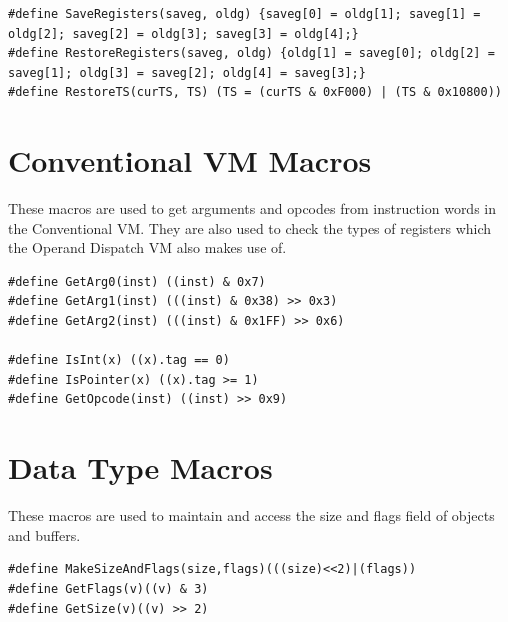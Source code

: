 \documentclass[english,a4paper,12pt]{report}
\begin{document}
\begin{lstlisting}
#define SaveRegisters(saveg, oldg) {saveg[0] = oldg[1]; saveg[1] = oldg[2]; saveg[2] = oldg[3]; saveg[3] = oldg[4];}
#define RestoreRegisters(saveg, oldg) {oldg[1] = saveg[0]; oldg[2] = saveg[1]; oldg[3] = saveg[2]; oldg[4] = saveg[3];}
#define RestoreTS(curTS, TS) (TS = (curTS & 0xF000) | (TS & 0x10800))
\end{lstlisting}

\section{Conventional VM Macros}
\label{sec:convmacros}

These macros are used to get arguments and opcodes from instruction
words in the Conventional VM. They are also used to check the types of
registers which the Operand Dispatch VM also makes use of.

\begin{lstlisting}
#define GetArg0(inst) ((inst) & 0x7) 
#define GetArg1(inst) (((inst) & 0x38) >> 0x3)
#define GetArg2(inst) (((inst) & 0x1FF) >> 0x6) 

#define IsInt(x) ((x).tag == 0)
#define IsPointer(x) ((x).tag >= 1)
#define GetOpcode(inst) ((inst) >> 0x9)
\end{lstlisting}

\section{Data Type Macros}
\label{sec:datamacros}
These macros are used to maintain and access the size and flags field
of objects and buffers.

\begin{lstlisting}
#define MakeSizeAndFlags(size,flags)(((size)<<2)|(flags))
#define GetFlags(v)((v) & 3)
#define GetSize(v)((v) >> 2)
\end{lstlisting}
\end{document}
